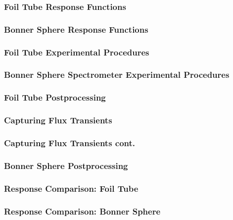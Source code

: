 \documentclass[fleqn]{beamer}
\begin{document}
\begin{frame}
\frametitle{Foil Tube Response Functions}

\end{frame}

\begin{frame}
\frametitle{Bonner Sphere Response Functions}

\end{frame}

\begin{frame}
\frametitle{Foil Tube Experimental Procedures}

\end{frame}

\begin{frame}
\frametitle{Bonner Sphere Spectrometer Experimental Procedures}

\end{frame}

\begin{frame}
\frametitle{Foil Tube Postprocessing}

\end{frame}

\begin{frame}
\frametitle{Capturing Flux Transients}

\end{frame}

\begin{frame}
\frametitle{Capturing Flux Transients cont.}

\end{frame}

\begin{frame}
\frametitle{Bonner Sphere Postprocessing}

\end{frame}

\begin{frame}
\frametitle{Response Comparison: Foil Tube}

\end{frame}

\begin{frame}
\frametitle{Response Comparison: Bonner Sphere}

\end{frame}
\end{document}
